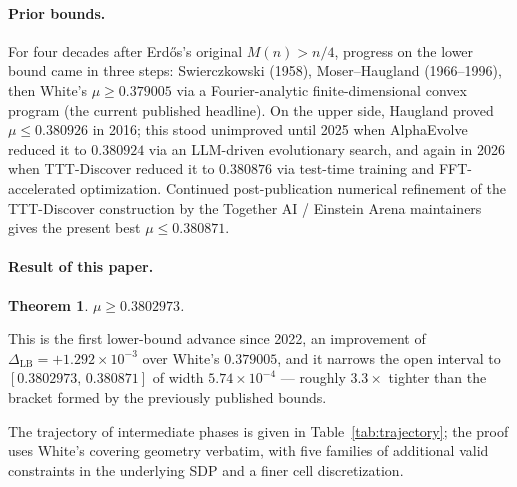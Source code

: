 \documentclass[11pt]{article}
\theoremstyle{plain}
\newtheorem{theorem}{Theorem}
\theoremstyle{definition}
\begin{document}
\paragraph{Prior bounds.}
For four decades after Erd\H{o}s's original $M(n) > n/4$, progress on
the lower bound came in three steps: Swierczkowski (1958),
Moser--Haugland (1966--1996), then White's $\mu \ge 0.379005$
\cite{White2023} via a Fourier-analytic finite-dimensional convex
program (the current published headline). On the upper side, Haugland
\cite{Haugland2016} proved $\mu \le 0.380926$ in 2016; this stood
unimproved until 2025 when AlphaEvolve \cite{AlphaEvolve2025} reduced
it to $0.380924$ via an LLM-driven evolutionary search, and again in
2026 when TTT-Discover \cite{TTTDiscover2026} reduced it to $0.380876$
via test-time training and FFT-accelerated optimization. Continued
post-publication numerical refinement of the TTT-Discover construction
by the Together AI / Einstein Arena maintainers \cite{TogetherComputer2026}
gives the present best $\mu \le 0.380871$.

\paragraph{Result of this paper.}
\begin{theorem}\label{thm:main}
$\mu \ge 0.3802973$.
\end{theorem}

This is the first lower-bound advance since 2022, an improvement of
$\Delta_{\text{LB}} = +1.292 \times 10^{-3}$ over White's $0.379005$,
and it narrows the open interval to $[0.3802973,\, 0.380871]$ of width
$5.74 \times 10^{-4}$ --- roughly $3.3\times$ tighter than the bracket
formed by the previously published bounds.

The trajectory of intermediate phases is given in
Table~\ref{tab:trajectory}; the proof uses White's covering geometry
verbatim, with five families of additional valid constraints in the
underlying SDP and a finer cell discretization.
\end{document}
